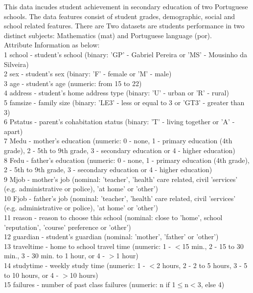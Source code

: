 \documentclass{article}
\begin{document}
This data incudes student achievement in secondary education of two Portuguese schools. The data features consist of student grades, demographic, social and school related features. There are Two datasets are students performance in two distinct subjects: Mathematics (mat) and Portuguese language (por). \\
Attribute Information as below: \\
1 school - student's school (binary: 'GP' - Gabriel Pereira or 'MS' - Mousinho da Silveira) \\
2 sex - student's sex (binary: 'F' - female or 'M' - male) \\
3 age - student's age (numeric: from 15 to 22) \\
4 address - student's home address type (binary: 'U' - urban or 'R' - rural) \\
5 famsize - family size (binary: 'LE3' - less or equal to 3 or 'GT3' - greater than 3) \\
6 Pstatus - parent's cohabitation status (binary: 'T' - living together or 'A' - apart) \\
7 Medu - mother's education (numeric: 0 - none, 1 - primary education (4th grade), 2  - 5th to 9th grade, 3  - secondary education or 4 - higher education) \\
8 Fedu - father's education (numeric: 0 - none, 1 - primary education (4th grade), 2 - 5th to 9th grade, 3 - secondary education or 4 - higher education) \\
9 Mjob - mother's job (nominal: 'teacher', 'health' care related, civil 'services' (e.g. administrative or police), 'at home' or 'other') \\
10 Fjob - father's job (nominal: 'teacher', 'health' care related, civil 'services' (e.g. administrative or police), 'at home' or 'other') \\
11 reason - reason to choose this school (nominal: close to 'home', school 'reputation', 'course' preference or 'other') \\
12 guardian - student's guardian (nominal: 'mother', 'father' or 'other') \\
13 traveltime - home to school travel time (numeric: 1 - $<$15 min., 2 - 15 to 30 min., 3 - 30 min. to 1 hour, or 4 - $>$1 hour) \\
14 studytime - weekly study time (numeric: 1 - $<$2 hours, 2 - 2 to 5 hours, 3 - 5 to 10 hours, or 4 - $>$10 hours) \\
15 failures - number of past class failures (numeric: n if 1$\leq$n$<$3, else 4) \\
\end{document}
